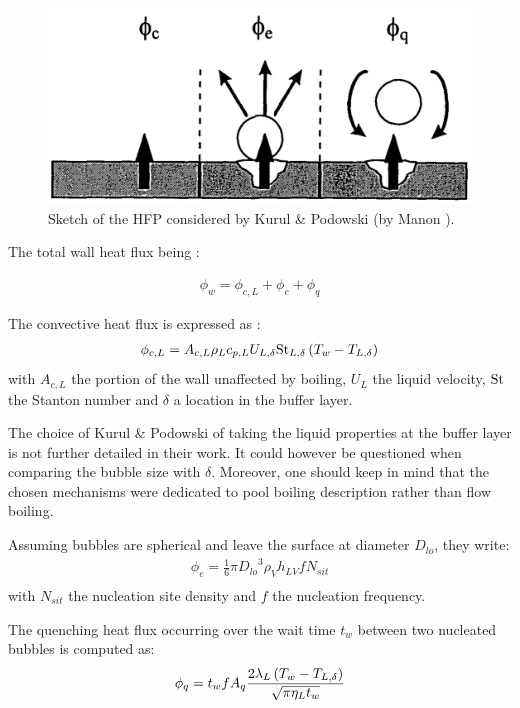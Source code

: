\begin{figure}[!h]
\centering
\includegraphics[width=0.6\linewidth]{img/HFP/KP/KP_hfp.PNG}
\caption{Sketch of the HFP considered by Kurul \& Podowski (by Manon \cite{manon_contribution_2000}).}
\label{fig:KP_hfp}
\end{figure}

The total wall heat flux being :

\begin{align}
\phi_{w}=\phi_{c,L}+\phi_{e}+\phi_{q}
\end{align}

The convective heat flux is expressed as :
\begin{align}
\phi_{c,L}=A_{c,L} \rho_{L} c_{p,L}U_{L,\delta} \mathrm{St}_{L,\delta}\left( T_{w}-T_{L,\delta} \right)
\label{eq:KP_hfp_phicL}
\end{align}
with $A_{c,L}$ the portion of the wall unaffected by boiling, $U_{L}$ the liquid velocity, $\mathrm{St}$ the Stanton number and $\delta$ a location in the buffer layer.

\begin{note*}{}
The choice of Kurul \& Podowski of taking the liquid properties at the buffer layer is not further detailed in their work. It could however be questioned when comparing the bubble size with $\delta$. Moreover, one should keep in mind that the chosen mechanisms were dedicated to pool boiling description rather than flow boiling.
\end{note*}


\npar
Assuming bubbles are spherical and leave the surface at diameter $D_{lo}$, they write:
\begin{align}
\phi_{e}=\frac{1}{6}\pi {D_{lo}}^{3}\rho_{V}h_{LV}fN_{sit}\\
\label{eq:KP_hfp_phie}
\end{align}
with $N_{sit}$ the nucleation site density and $f$ the nucleation frequency.

\npar
The quenching heat flux occurring over the wait time $t_{w}$ between two nucleated bubbles is computed as:  
\begin{align}
\phi_{q}=t_{w}fA_{q}\frac{2\lambda_{L}\left( T_{w}-T_{L,\delta} \right)}{\sqrt{\pi \eta_{L} t_{w}}}
\label{eq:KP_hfp_phiq}
\end{align}

